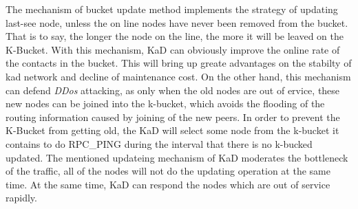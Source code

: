 {The mechanism of bucket update method implements the strategy of updating last-see node, unless the on line nodes have never been removed from the bucket.
That is to say, the longer the node on the line, the more it will be leaved on the K-Bucket.
With this mechanism, KaD can obviously improve the online rate of the contacts in the bucket.
This will bring up greate advantages on the stabilty of kad network and decline of maintenance cost.
On the other hand, this mechanism can defend \emph{DDos} attacking, as only when the old nodes are out of ervice, these new nodes can be joined into the k-bucket, which avoids the flooding of the routing information caused by joining of the new peers.
In order to prevent the K-Bucket from getting old, the KaD will select some node from the k-bucket it contains to do RPC\_PING during the interval that there is no k-bucked updated.
The mentioned updateing mechanism of KaD moderates the bottleneck of the traffic, all of the nodes will not do the updating operation at the same time.
At the same time, KaD can respond the nodes which are out of service rapidly.
}

